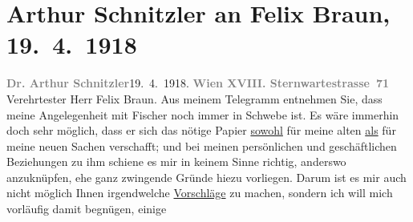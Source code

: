 

         \renewcommand{\erwaehnteInstitutionen}{Institutionen: Georg Müller Verlag, S. Fischer Verlag}
         \renewcommand{\erwaehnteOrte}{Orte: München, Sternwartestraße, Wien}
         \renewcommand{\erwaehnteWerke}{Werke: Casanovas Heimfahrt, Die Schwestern oder Casanova in Spa. Lustspiel in Versen, Doktor Gräsler, Badearzt, Gesammelte Werke}
               \section[Arthur Schnitzler an Felix Braun, 19. 4. 1918]{ Arthur Schnitzler an Felix Braun, 19. 4. 1918}\nopagebreak{}\rehead{ }\begin{ledgroupsized}[t]{13cm}\normalsize\beginnumbering \toendnotes[C]{\smallbreak\pagebreak[2]} 
\toendnotes[C]{\smallbreak}\pstart
           {\pb}\textcolor{gray}{\textbf{Dr. Arthur Schnitzler}}\hfill 19. 4. 1918.\pend
           \pstart
           \textcolor{gray}{\textbf{Wien XVIII. Sternwartestrasse 71}}\pend
           \pstart\center{}Verehrtester Herr Felix Braun.\pend\pstart
           Aus meinem Telegramm entnehmen Sie, dass meine Angelegenheit mit Fischer noch immer in Schwebe ist. Es wäre immerhin doch sehr
               möglich, dass er sich das nötige Papier \uline{sowohl} für
               meine alten \uline{als} für meine neuen Sachen verschafft;
               und bei meinen persönlichen und geschäftlichen Beziehungen zu ihm schiene es mir in
               keinem Sinne richtig, anderswo anzuknüpfen, ehe ganz zwingende Gründe hiezu
               vorliegen. Darum ist es mir auch nicht möglich Ihnen \introOben{}irgend\introOben{}welche \uline{Vorschläge} zu machen, sondern ich
               will mich vorläufig damit begnügen,  einige

\end{ledgroupsized}
